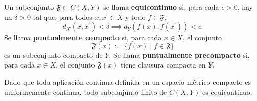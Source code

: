 \begin{definition}\label{def:1.10}
Un subconjunto $\mathfrak{F}\subset C(X,Y)$ se llama \textbf{equicontinuo} si, para cada $\epsilon>0$, hay un $\delta>0$ tal que, para todos $x, x^{\prime}\in X$ y todo $f\in\mathfrak{F}$,
\[ d_{X}(x,x^{\prime})<\delta \implies d_{Y}(f(x),f(x^{\prime}))<\epsilon. \]
Se llama \textbf{puntualmente compacto} si, para cada $x\in X$, el conjunto
\[ \mathfrak{F}(x) := \{f(x) \mid f\in\mathfrak{F}\} \]
es un subconjunto compacto de $Y$. Se llama \textbf{puntualmente precompacto} si, para cada $x\in X$, el conjunto $\mathfrak{F}(x)$ tiene clausura compacta en $Y$.
\end{definition}

Dado que toda aplicación continua definida en un espacio métrico compacto es uniformemente continua, todo subconjunto finito de $C(X,Y)$ es equicontinuo.

